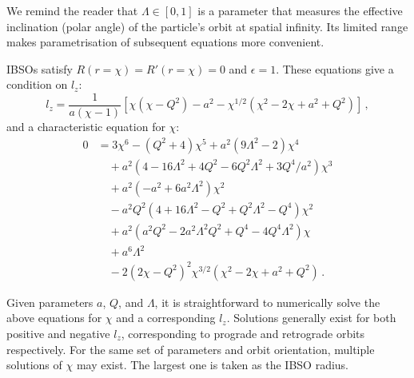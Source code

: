 \documentclass[
    reprint,
    prd,
    nofootinbib,
    amsmath,amssymb,
    aps,
    floatfix,
]{revtex4-2}
\begin{document}
We remind the reader that $\Lambda \in [0, 1]$ is a parameter that measures the effective inclination (polar angle) of the particle's orbit at spatial infinity. Its limited range makes parametrisation of subsequent equations more convenient.

IBSOs satisfy $R(r = \chi) = R'(r = \chi) = 0$ and $\epsilon = 1$. These equations give a condition on $l_{z}$:
\begin{equation}
    l_{z} = \frac{1}{a(\chi - 1)} \left[ \chi (\chi - Q^{2}) - a^{2} - \chi^{1/2} (\chi^{2} - 2\chi + a^{2} + Q^{2}) \right] \, ,
\end{equation}
and a characteristic equation for $\chi$:
\begin{equation} \label{eq:ibso_kn}
    \begin{split}
        0 &= 3\chi^{6} - (Q^{2} + 4) \chi^{5} + a^{2}(9\Lambda^{2} - 2) \chi^{4} \\
        &\quad+ a^{2} \left( 4 - 16\Lambda^{2} + 4Q^{2} - 6Q^{2}\Lambda^{2} + 3Q^{4}/a^{2} \right) \chi^{3} \\
        &\quad+ a^{2} \left( -a^{2} + 6a^{2} \Lambda^{2} \right) \chi^{2} \\
        &\quad- a^{2} Q^{2} \left( 4 + 16\Lambda^{2} - Q^{2} + Q^{2} \Lambda^{2} - Q^{4} \right) \chi^{2} \\
        &\quad+ a^{2} \left( a^{2} Q^{2} - 2a^{2} \Lambda^{2} Q^{2} + Q^{4} - 4Q^{4} \Lambda^{2} \right) \chi \\
        &\quad+ a^{6} \Lambda^{2} \\
        &\quad- 2 (2\chi - Q^{2})^{2} \chi^{3/2} (\chi^{2} - 2\chi + a^{2} + Q^{2}) \, .
    \end{split}
\end{equation}



Given parameters $a$, $Q$, and $\Lambda$, it is straightforward to numerically solve the above equations for $\chi$ and a corresponding $l_{z}$. Solutions generally exist for both positive and negative $l_{z}$, corresponding to prograde and retrograde orbits respectively. For the same set of parameters and orbit orientation, multiple solutions of $\chi$ may exist. The largest one is taken as the IBSO radius.
\end{document}
